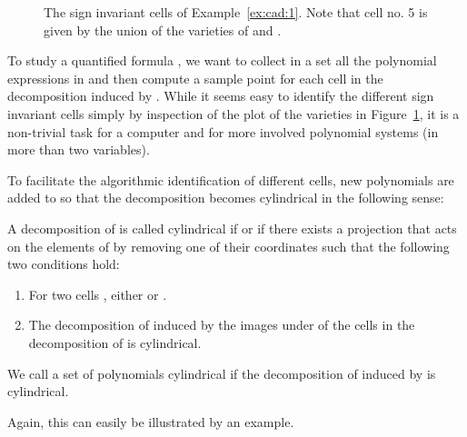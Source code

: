 \documentclass{llncs}
\begin{document}
\begin{figure}
\begin{center}
\end{center}
\caption{\label{fig:cad}The sign invariant cells of Example~\ref{ex:cad:1}. Note
  that cell no. 5 is given by the union of the varieties of  and .}
\end{figure}

To study a quantified formula , we want to  collect in a set
 all the polynomial expressions in  and then compute a sample point for
each cell in the decomposition induced by .  While it seems easy to identify
the different sign invariant cells simply by inspection of the plot of the
varieties in Figure~\ref{fig:cad}, it is a non-trivial task for a computer and
for more involved polynomial systems (in more than two variables).

To facilitate the algorithmic identification of different cells, new polynomials
are added to  so that the decomposition becomes cylindrical in the following
sense:

\begin{definition}
  A decomposition of\/  is called cylindrical if  or if there
  exists a projection  that acts on the
  elements of\/  by removing one of
  their coordinates such that the following two conditions hold:
  \begin{enumerate}
  \item For two cells , either 
    or .
  \item The decomposition of  induced by the images
    under  of the cells in the decomposition of  is
    cylindrical.
  \end{enumerate}
  We call a set of polynomials  cylindrical
  if the decomposition of\/  induced by  is cylindrical.
\end{definition}
Again, this can easily be illustrated by an example.
\end{document}
